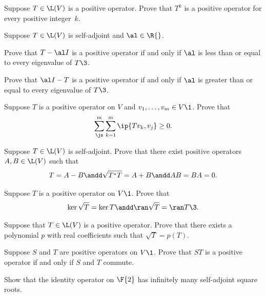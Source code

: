\exercise
Suppose $T \in \L(V)$ is a positive operator. Prove that $T^k$ is a positive operator for every positive integer~$k$.


\exercise
Suppose $T \in \L(V)$ is self-adjoint and $\al \in \R{}$.
\begin{subtheorem}
\item
Prove that $T - \al I$ is a positive operator if and only if $\al$ is less than or equal to every eigenvalue of $T\3$.
\item
Prove that $\al I - T$ is a positive operator if and only if $\al$ is greater than or equal to every eigenvalue of $T\3$.
\end{subtheorem}
\exercisesubtheoremend


\exercise
Suppose $T$ is a positive operator on $V$ and $v_1, \ldots, v_m \in V\1$. Prove that
\[
\sum_{\js}^m \sum_{k=1}^m \ip{Tv_k, v_j} \ge 0.
\]
\vspace{-14bp}


\exercise
Suppose $T \in \L(V)$ is self-adjoint. Prove that there exist positive operators $A, B \in \L(V)$ such that
\[
T = A - B \andd \sqrt{T^* T} = A + B \andd AB = BA = 0.
\]
\exercisedisplayend


\exercise
Suppose $T$ is a positive operator on $V\1$. Prove that
\[
\ker \sqrt{T} = \ker T \andd \ran \sqrt{T} = \ran T\3.
\]
\exercisedisplayend


\exercise
Suppose that $T \in \L(V)$ is a positive operator. Prove that there exists a polynomial $p$ with real coefficients such that
$\sqrt{T} = p(T)$. \label{2psqrt}

\exercise
Suppose $S$ and $T$ are positive operators on $V\1$. Prove that $ST$ is a positive operator if and only if $S$ and $T$ commute. \label{2ProdPos} 


\exercise
Show that the identity operator on $\F{2}$ has infinitely many self-adjoint square roots.

